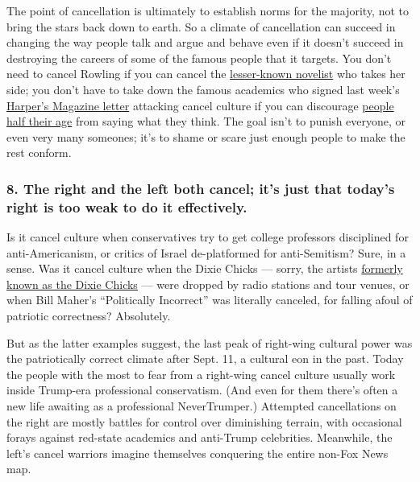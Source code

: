 The point of cancellation is ultimately to establish norms for the
majority, not to bring the stars back down to earth. So a climate of
cancellation can succeed in changing the way people talk and argue and
behave even if it doesn't succeed in destroying the careers of some of
the famous people that it targets. You don't need to cancel Rowling if
you can cancel the
\href{https://www.insider.com/gillian-philip-childrens-author-sacked-tweeting-support-jk-rowling-2020-7}{lesser-known
novelist} who takes her side; you don't have to take down the famous
academics who signed last week's
\href{https://harpers.org/a-letter-on-justice-and-open-debate/}{Harper's
Magazine letter} attacking cancel culture if you can discourage
\href{https://twitter.com/SwipeWright/status/1281793002986336256}{people
half their age} from saying what they think. The goal isn't to punish
everyone, or even very many someones; it's to shame or scare just enough
people to make the rest conform.

\hypertarget{8-the-right-and-the-left-both-cancel-its-just-that-todays-right-is-too-weak-to-do-it-effectively}{%
\subsubsection{8. The right and the left both cancel; it's just that
today's right is too weak to do it
effectively.}\label{8-the-right-and-the-left-both-cancel-its-just-that-todays-right-is-too-weak-to-do-it-effectively}}

Is it cancel culture when conservatives try to get college professors
disciplined for anti-Americanism, or critics of Israel de-platformed for
anti-Semitism? Sure, in a sense. Was it cancel culture when the Dixie
Chicks --- sorry, the artists
\href{https://www.nytimes.com/2020/06/25/arts/music/dixie-chicks-change-name.html}{formerly
known as the Dixie Chicks} --- were dropped by radio stations and tour
venues, or when Bill Maher's ``Politically Incorrect'' was literally
canceled, for falling afoul of patriotic correctness? Absolutely.

But as the latter examples suggest, the last peak of right-wing cultural
power was the patriotically correct climate after Sept. 11, a cultural
eon in the past. Today the people with the most to fear from a
right-wing cancel culture usually work inside Trump-era professional
conservatism. (And even for them there's often a new life awaiting as a
professional NeverTrumper.) Attempted cancellations on the right are
mostly battles for control over diminishing terrain, with occasional
forays against red-state academics and anti-Trump celebrities.
Meanwhile, the left's cancel warriors imagine themselves conquering the
entire non-Fox News map.

